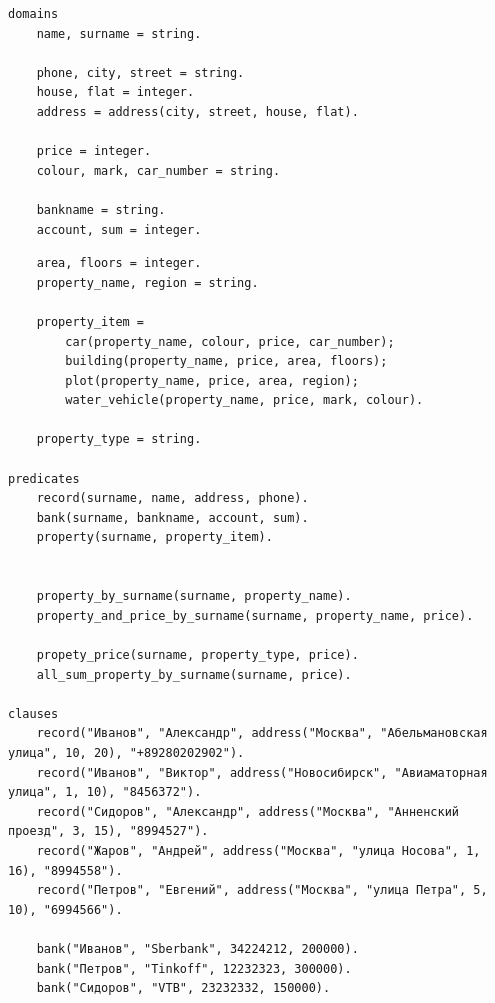 \begin{lstlisting}[caption=Программа <<Собственники>>]
domains
	name, surname = string.
	
	phone, city, street = string.
	house, flat = integer.
	address = address(city, street, house, flat).
	
	price = integer.
	colour, mark, car_number = string.
	
	bankname = string.
	account, sum = integer.
\end{lstlisting}
\begin{lstlisting}	
	area, floors = integer.
	property_name, region = string.
	
	property_item = 
		car(property_name, colour, price, car_number);
		building(property_name, price, area, floors);
		plot(property_name, price, area, region);
		water_vehicle(property_name, price, mark, colour).		
	
	property_type = string.

predicates
	record(surname, name, address, phone).
	bank(surname, bankname, account, sum).
	property(surname, property_item).
	
	
	property_by_surname(surname, property_name).
	property_and_price_by_surname(surname, property_name, price).
	
	propety_price(surname, property_type, price).
	all_sum_property_by_surname(surname, price).

clauses
	record("Иванов", "Александр", address("Москва", "Абельмановская улица", 10, 20), "+89280202902").
	record("Иванов", "Виктор", address("Новосибирск", "Авиаматорная улица", 1, 10), "8456372").
	record("Сидоров", "Александр", address("Москва", "Анненский проезд", 3, 15), "8994527").
	record("Жаров", "Андрей", address("Москва", "улица Носова", 1, 16), "8994558").
	record("Петров", "Евгений", address("Москва", "улица Петра", 5, 10), "6994566").
	
	bank("Иванов", "Sberbank", 34224212, 200000).
	bank("Петров", "Tinkoff", 12232323, 300000).
	bank("Сидоров", "VTB", 23232332, 150000).

\end{lstlisting}
\clearpage
